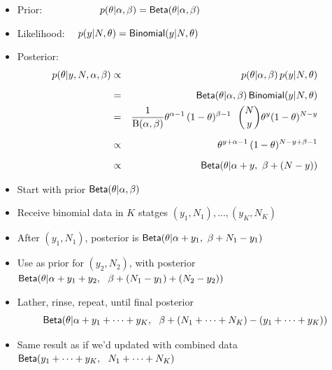 \documentclass[10pt]{report}
\begin{document}
%
\vspace*{-2pt}
\begin{itemize}
\item Prior: \ \ \ \ \ \ \ \ \ \ \ $p(\theta|\alpha,\beta) =
  \text{\sf Beta}(\theta|\alpha,\beta)$
\item Likelihood: \ \ $p(y|N,\theta) = \text{\sf Binomial}(y|N,\theta)$
\item Posterior:
{\small
\begin{eqnarray*}
p(\theta|y,N,\alpha,\beta)
& \propto & p(\theta|\alpha,\beta) \, p(y|N,\theta)
\\[6pt]
& = & \text{\sf Beta}(\theta|\alpha,\beta)
      \, \text{\sf Binomial}(y|N,\theta)
\\
& = & \frac{1}{{\text B}(\alpha,\beta)}
      \theta^{\alpha - 1} \,
      (1 - \theta)^{\beta-1}
      \ \
      \binom{N}{y} \theta^{y} (1 - \theta)^{N-y}
\\[6pt]
& \propto &
      \theta^{y + \alpha - 1} \,
      (1 - \theta)^{N - y + \beta - 1}
\\[6pt]
& \propto & \text{\sf Beta}(\theta|\alpha + y, \ \beta + (N - y))
\end{eqnarray*}
}
\end{itemize}


%
\vspace*{-4pt}
\begin{itemize}
\item Start with prior $\text{\sf Beta}(\theta|\alpha,\beta)$
\item Receive binomial data in $K$ statges $(y_1, N_1), \ldots, (y_K, N_K)$
\item After $(y_1,N_1)$, posterior is
  $\text{\sf Beta}(\theta|\alpha + y_1, \ \beta + N_1 - y_1)$
\item Use as prior for $(y_2,N_2)$, with posterior \\[3pt]
  $\distro{Beta}(\theta|\alpha + y_1 + y_2, \ \ \beta + (N_1 -
  y_1) + (N_2 - y_2))$
\item Lather, rinse, repeat, until final posterior
\[
\text{\sf Beta}(\theta|\alpha + y_1 + \cdots + y_K, \ \ \beta + (N_1 +
\cdots + N_K) - (y_1 + \cdots + y_K))
\]
\item Same result as if we'd updated with combined data \\[3pt]
$\text{\sf Beta}(y_1 + \cdots + y_K, \ \ N_1 + \cdots + N_K)$
\end{itemize}


\end{document}
